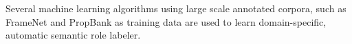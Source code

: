 Several machine learning algorithms\cite{gildea2002automatic,pradhan2004shallow,pradhan2005semantic,
marquez2008semantic}
using large scale annotated
corpora, such as FrameNet\cite{baker1998berkeley}
and PropBank\cite{kingsbury2002treebank} as training data
are used to learn domain-specific, automatic semantic role labeler.

%
%
%


